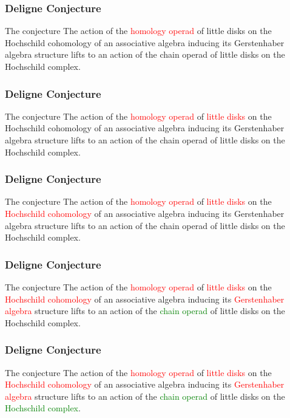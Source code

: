 \documentclass{beamer}
\theoremstyle{definition}
\begin{document}
\begin{frame}
	\frametitle{Deligne Conjecture}
	\begin{block}{The conjecture}
		The action of the \textcolor{red}{homology operad} of little disks on the Hochschild cohomology of an associative algebra inducing its Gerstenhaber algebra structure lifts to an action of the chain operad of little disks on the Hochschild complex.
	\end{block}
\end{frame}

\begin{frame}
		\frametitle{Deligne Conjecture}
	\begin{block}{The conjecture}
	The action of the \textcolor{red}{homology operad} of \textcolor{red}{little disks} on the Hochschild cohomology of an associative algebra inducing its Gerstenhaber algebra structure lifts to an action of the chain operad of little disks on the Hochschild complex.
\end{block}
\end{frame}

\begin{frame}
	\frametitle{Deligne Conjecture}
	\begin{block}{The conjecture}
		The action of the \textcolor{red}{homology operad} of \textcolor{red}{little disks} on the \textcolor{red}{Hochschild cohomology} of an associative algebra inducing its Gerstenhaber algebra structure lifts to an action of the chain operad of little disks on the Hochschild complex.
	\end{block}
\end{frame}

\begin{frame}
	\frametitle{Deligne Conjecture}
	\begin{block}{The conjecture}
		The action of the \textcolor{red}{homology operad} of \textcolor{red}{little disks} on the \textcolor{red}{Hochschild cohomology} of an associative algebra inducing its \textcolor{red}{Gerstenhaber algebra} structure lifts to an action of the \textcolor{green}{chain operad} of little disks on the Hochschild complex.
	\end{block}
\end{frame}

\begin{frame}
	\frametitle{Deligne Conjecture}
	\begin{block}{The conjecture}
		The action of the \textcolor{red}{homology operad} of \textcolor{red}{little disks} on the \textcolor{red}{Hochschild cohomology} of an associative algebra inducing its \textcolor{red}{Gerstenhaber algebra} structure lifts to an action of the \textcolor{green}{chain operad} of little disks on the \textcolor{green}{Hochschild complex}.
	\end{block}
\end{frame}
\end{document}
